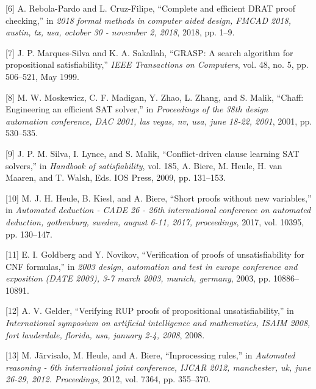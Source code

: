\documentclass[
]{report}
\begin{document}
\leavevmode\hypertarget{ref-DBLP:confux2ffmcadux2fRebola-PardoC18}{}%
{[}6{]} A. Rebola-Pardo and L. Cruz-Filipe, ``Complete and efficient
DRAT proof checking,'' in \emph{2018 formal methods in computer aided
design, FMCAD 2018, austin, tx, usa, october 30 - november 2, 2018},
2018, pp. 1--9.

\leavevmode\hypertarget{ref-769433}{}%
{[}7{]} J. P. Marques-Silva and K. A. Sakallah, ``GRASP: A search
algorithm for propositional satisfiability,'' \emph{IEEE Transactions on
Computers}, vol. 48, no. 5, pp. 506--521, May 1999.

\leavevmode\hypertarget{ref-DBLP:confux2fdacux2fMoskewiczMZZM01}{}%
{[}8{]} M. W. Moskewicz, C. F. Madigan, Y. Zhao, L. Zhang, and S. Malik,
``Chaff: Engineering an efficient SAT solver,'' in \emph{Proceedings of
the 38th design automation conference, DAC 2001, las vegas, nv, usa,
june 18-22, 2001}, 2001, pp. 530--535.

\leavevmode\hypertarget{ref-DBLP:seriesux2ffaiaux2fSilvaLM09}{}%
{[}9{]} J. P. M. Silva, I. Lynce, and S. Malik, ``Conflict-driven clause
learning SAT solvers,'' in \emph{Handbook of satisfiability}, vol. 185,
A. Biere, M. Heule, H. van Maaren, and T. Walsh, Eds. IOS Press, 2009,
pp. 131--153.

\leavevmode\hypertarget{ref-DBLP:confux2fcadeux2fHeuleKB17}{}%
{[}10{]} M. J. H. Heule, B. Kiesl, and A. Biere, ``Short proofs without
new variables,'' in \emph{Automated deduction - CADE 26 - 26th
international conference on automated deduction, gothenburg, sweden,
august 6-11, 2017, proceedings}, 2017, vol. 10395, pp. 130--147.

\leavevmode\hypertarget{ref-DBLP:confux2fdateux2fGoldbergN03}{}%
{[}11{]} E. I. Goldberg and Y. Novikov, ``Verification of proofs of
unsatisfiability for CNF formulas,'' in \emph{2003 design, automation
and test in europe conference and exposition (DATE 2003), 3-7 march
2003, munich, germany}, 2003, pp. 10886--10891.

\leavevmode\hypertarget{ref-DBLP:confux2fisaimux2fGelder08}{}%
{[}12{]} A. V. Gelder, ``Verifying RUP proofs of propositional
unsatisfiability,'' in \emph{International symposium on artificial
intelligence and mathematics, ISAIM 2008, fort lauderdale, florida, usa,
january 2-4, 2008}, 2008.

\leavevmode\hypertarget{ref-DBLP:confux2fcadeux2fJarvisaloHB12}{}%
{[}13{]} M. Järvisalo, M. Heule, and A. Biere, ``Inprocessing rules,''
in \emph{Automated reasoning - 6th international joint conference, IJCAR
2012, manchester, uk, june 26-29, 2012. Proceedings}, 2012, vol. 7364,
pp. 355--370.
\end{document}
